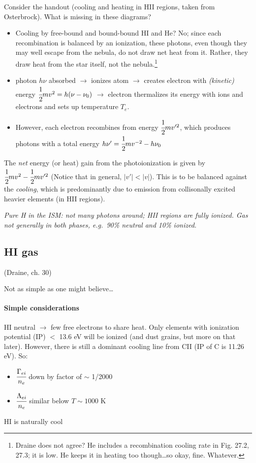 \documentclass[12pt]{article}
\newcommand{\mar}[1]{\hspace{0pt}\marginpar{-\textcolor{black}{#1}-}}
\newcommand{\mynotes}[1]{{\fontfamily{cmss}\selectfont \textit{#1}}}
\begin{document}
\mar{159}Consider the handout (cooling and heating in HII regions, taken from
Osterbrock). What is missing in these diagrams?
\begin{itemize}
    \item Cooling by free-bound and bound-bound HI and He?
        No; since each recombination is balanced by an ionization, these
        photons, even though they may well escape from the nebula, do
        not draw net heat from it. Rather, they draw heat from the star
        itself, not the nebula.\footnote{Draine does not agree? He includes
        a recombination cooling rate in Fig. 27.2, 27.3; it is low.
        He keeps it in heating too though\ldots so okay, fine. Whatever.}
    \item photon $h\nu$ absorbed
        $\rightarrow$
        ionizes atom
        $\rightarrow$
        creates electron with \mynotes{(kinetic)} energy
        $\cfrac{1}{2}mv^{2} = h(\nu - \nu_{0})  $
        $\rightarrow$
        electron thermalizes its energy with ions and electrons and
        sets up temperature $T_{e}$.
    \item However, each electron recombines from energy $\cfrac{1}{2}mv'^{2}$,
        which produces photons with a total energy
        $h\nu' = \cfrac{1}{2}mv^{-2} - h\nu_{0} $
\end{itemize}
The \emph{net} energy (or heat) gain from the photoionization is given by
$ \cfrac{1}{2}mv^{2} - \cfrac{1}{2}mv'^{2} $
(Notice that in general, $|v'| < |v|$).
This is to be balanced against the \emph{cooling}, which is predominantly
due to emission from collisonally excited heavier elements
(in HII regions).

\mynotes{Pure H in the ISM: not many photons around; HII regions are fully
ionized. Gas not generally in both phases, e.g.\ 90\% neutral and 10\% ionized.}

\subsection{HI gas}\mar{160}
(Draine, ch. 30)

Not as simple as one might believe\ldots
\paragraph{Simple considerations}
HI neutral $\rightarrow$ few free electrons to share heat.
Only elements with ionization potential (IP) $<$ 13.6 eV will be
ionized (and dust grains, but more on that later).
However, there is still a dominant cooling line from CII
(IP of C is 11.26 eV). So:
\begin{itemize}
    \item $\cfrac{\Gamma_{ei}}{n_{e}} $ down by factor of $\sim$ 1/2000
    \item $\cfrac{\Lambda_{ei}}{n_{e}} $ similar below $T \sim 1000$ K
\end{itemize}
HI is naturally cool
\end{document}
